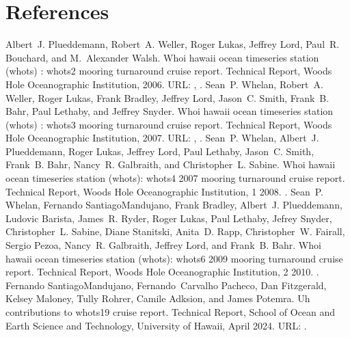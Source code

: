 \documentclass[a4paper,10pt,english,openany,oneside]{sphinxmanual}
\begin{document}
\chapter{References}
\label{\detokenize{references:references}}\label{\detokenize{references:refs}}\label{\detokenize{references::doc}}
\begin{sphinxthebibliography}{10}
\sphinxAtStartPar
Albert J. Plueddemann, Robert A. Weller, Roger Lukas, Jeffrey Lord, Paul R. Bouchard, and M. Alexander Walsh. Whoi hawaii ocean timeseries station (whots) : whots\sphinxhyphen{}2 mooring turnaround cruise report. Technical Report, Woods Hole Oceanographic Institution, 2006. URL: , .
\sphinxAtStartPar
Sean P. Whelan, Robert A. Weller, Roger Lukas, Frank Bradley, Jeffrey Lord, Jason C. Smith, Frank B. Bahr, Paul Lethaby, and Jeffrey Snyder. Whoi hawaii ocean timeseries station (whots) : whots\sphinxhyphen{}3 mooring turnaround cruise report. Technical Report, Woods Hole Oceanographic Institution, 2007. URL: , .
\sphinxAtStartPar
Sean P. Whelan, Albert J. Plueddemann, Roger Lukas, Jeffrey Lord, Paul Lethaby, Jason C. Smith, Frank B. Bahr, Nancy R. Galbraith, and Christopher L. Sabine. Whoi hawaii ocean timeseries station (whots): whots\sphinxhyphen{}4 2007 mooring turnaround cruise report. Technical Report, Woods Hole Oceanographic Institution, 1 2008. .
\sphinxAtStartPar
Sean P. Whelan, Fernando Santiago\sphinxhyphen{}Mandujano, Frank Bradley, Albert J. Plueddemann, Ludovic Barista, James R. Ryder, Roger Lukas, Paul Lethaby, Jefrey Snyder, Christopher L. Sabine, Diane Stanitski, Anita D. Rapp, Christopher W. Fairall, Sergio Pezoa, Nancy R. Galbraith, Jeffrey Lord, and Frank B. Bahr. Whoi hawaii ocean timeseries station (whots): whots\sphinxhyphen{}6 2009 mooring turnaround cruise report. Technical Report, Woods Hole Oceanographic Institution, 2 2010. .
\sphinxAtStartPar
Fernando Santiago\sphinxhyphen{}Mandujano, Fernando Carvalho Pacheco, Dan Fitzgerald, Kelsey Maloney, Tully Rohrer, Camile Adksion, and James Potemra. Uh contributions to whots\sphinxhyphen{}19 cruise report. Technical Report, School of Ocean and Earth Science and Technology, University of Hawaii, April 2024. URL: .

\end{sphinxthebibliography}
\end{document}
